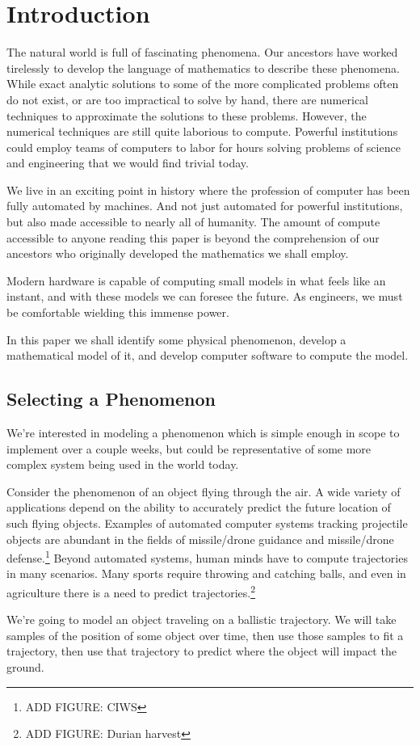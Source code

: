 \section{Introduction}

The natural world is full of fascinating phenomena. Our ancestors have worked tirelessly to develop the language of mathematics to describe these phenomena. While exact analytic solutions to some of the more complicated problems often do not exist, or are too impractical to solve by hand, there are numerical techniques to approximate the solutions to these problems. However, the numerical techniques are still quite laborious to compute. Powerful institutions could employ teams of computers to labor for hours solving problems of science and engineering that we would find trivial today. 

We live in an exciting point in history where the profession of computer has been fully automated by machines. And not just automated for powerful institutions, but also made accessible to nearly all of humanity. The amount of compute accessible to anyone reading this paper is beyond the comprehension of our ancestors who originally developed the mathematics we shall employ. 

Modern hardware is capable of computing small models in what feels like an instant, and with these models we can foresee the future. As engineers, we must be comfortable wielding this immense power. 

In this paper we shall identify some physical phenomenon, develop a mathematical model of it, and develop computer software to compute the model.

\subsection{Selecting a Phenomenon}

We're interested in modeling a phenomenon which is simple enough in scope to implement over a couple weeks, but could be representative of some more complex system being used in the world today. 

Consider the phenomenon of an object flying through the air. A wide variety of applications depend on the ability to accurately predict the future location of such flying objects. Examples of automated computer systems tracking projectile objects are abundant in the fields of missile/drone guidance and missile/drone defense.\footnote{ADD FIGURE: CIWS} Beyond automated systems, human minds have to compute trajectories in many scenarios. Many sports require throwing and catching balls, and even in agriculture there is a need to predict trajectories.\footnote{ADD FIGURE: Durian harvest}

We're going to model an object traveling on a ballistic trajectory. We will take samples of the position of some object over time, then use those samples to fit a trajectory, then use that trajectory to predict where the object will impact the ground.


